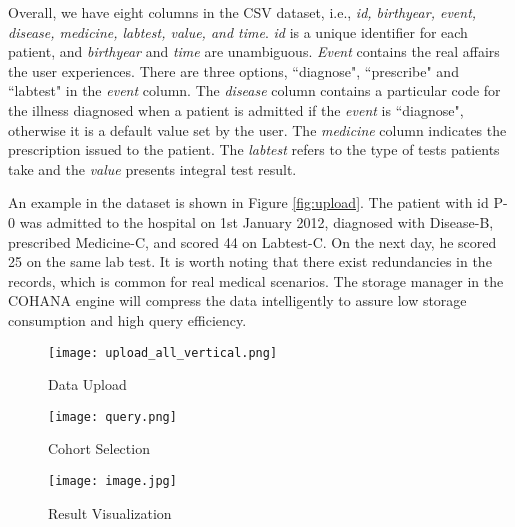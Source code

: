Overall, we have eight columns in the CSV dataset, i.e., \emph{id, birthyear, event, disease, medicine, labtest, value, and time}. \emph{id} is a unique identifier for each patient, and \emph{birthyear} and \emph{time} are unambiguous. 
\emph{Event} contains the real affairs the user experiences.
There are three options, ``diagnose", ``prescribe" and ``labtest" in the \emph{event} column.
The \emph{disease} column contains a particular code for the illness diagnosed when a patient is admitted if the \emph{event} is ``diagnose", otherwise it is a default value set by the user.
The \emph{medicine} column indicates the prescription issued to the patient. %
The \emph{labtest} refers to the type of tests patients take and the \emph{value} presents integral test result. 

An example in the dataset is shown in Figure \ref{fig:upload}. The patient with id P-0 was admitted to the hospital on 1st January 2012, diagnosed with Disease-B, prescribed Medicine-C, and scored 44 on Labtest-C. On the next day, he scored 25 on the same lab test. 
It is worth noting that there exist redundancies in the records, which is common for real medical scenarios. 
The storage manager in the COHANA engine will compress the data intelligently to assure low storage consumption and high query efficiency.



\begin{figure*}
\begin{minipage}{0.3\textwidth}
    \centering
    \texttt{[image: upload\_all\_vertical.png]}
    \caption{Data Upload}
    \label{fig:upload}
\end{minipage}
\begin{minipage}{0.38\textwidth}
    \texttt{[image: query.png]}
    \caption{Cohort Selection}
    \label{fig:cohort}
\end{minipage}
\begin{minipage}{0.3\textwidth}
    \texttt{[image: image.jpg]}
    \caption{Result Visualization}
    \label{fig:visual}
\end{minipage}

\end{figure*}

